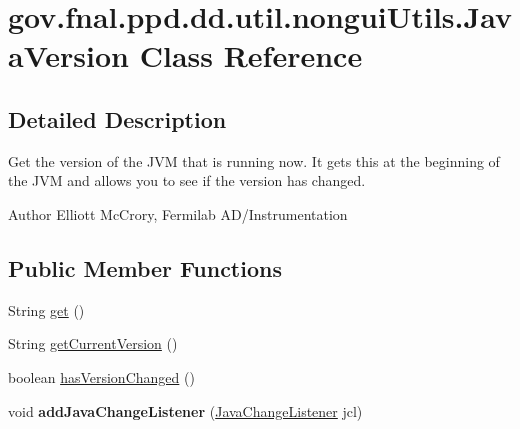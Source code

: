 \hypertarget{classgov_1_1fnal_1_1ppd_1_1dd_1_1util_1_1nonguiUtils_1_1JavaVersion}{\section{gov.\-fnal.\-ppd.\-dd.\-util.\-nongui\-Utils.\-Java\-Version Class Reference}
\label{classgov_1_1fnal_1_1ppd_1_1dd_1_1util_1_1nonguiUtils_1_1JavaVersion}
}


\subsection{Detailed Description}
Get the version of the J\-V\-M that is running now. It gets this at the beginning of the J\-V\-M and allows you to see if the version has changed.

\begin{DoxyAuthor}{Author}
Elliott Mc\-Crory, Fermilab A\-D/\-Instrumentation 
\end{DoxyAuthor}
\subsection*{Public Member Functions}
\begin{DoxyCompactItemize}
\item 
String \hyperlink{classgov_1_1fnal_1_1ppd_1_1dd_1_1util_1_1nonguiUtils_1_1JavaVersion_a4cf56269f3f9b24efd54f9dd9fb582d5}{get} ()
\item 
String \hyperlink{classgov_1_1fnal_1_1ppd_1_1dd_1_1util_1_1nonguiUtils_1_1JavaVersion_a62a8c1919158951af98647fedf0dec57}{get\-Current\-Version} ()
\item 
boolean \hyperlink{classgov_1_1fnal_1_1ppd_1_1dd_1_1util_1_1nonguiUtils_1_1JavaVersion_aa2e6bfccd08763f02d852f94d92756b3}{has\-Version\-Changed} ()
\item 
\hypertarget{classgov_1_1fnal_1_1ppd_1_1dd_1_1util_1_1nonguiUtils_1_1JavaVersion_a287cd5bd534c301887af7af810ffd166}{void {\bfseries add\-Java\-Change\-Listener} (\hyperlink{interfacegov_1_1fnal_1_1ppd_1_1dd_1_1util_1_1nonguiUtils_1_1JavaChangeListener}{Java\-Change\-Listener} jcl)}\label{classgov_1_1fnal_1_1ppd_1_1dd_1_1util_1_1nonguiUtils_1_1JavaVersion_a287cd5bd534c301887af7af810ffd166}

\end{DoxyCompactItemize}
